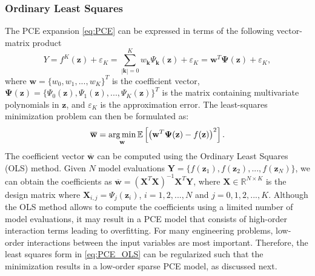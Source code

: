\subsubsection{Ordinary Least Squares}
The PCE expansion \eqref{eq:PCE} can be expressed in terms of the following vector-matrix product
\begin{equation}\label{eq:LSM}
Y = f^{K}(\mathbf{z}) +\varepsilon_K = \sum_{|\mathbf{k}| = 0}^K w_{\mathbf{k}}\Psi_{\mathbf{k}}(\mathbf{z}) + \varepsilon_K = \mathbf{w}^T\boldsymbol{\Psi}(\mathbf{z}) +\varepsilon_K,
\end{equation} 
where $\mathbf{w} = \{w_0,w_1,...,w_K\}^T$ is the coefficient vector, $\boldsymbol{\Psi}(\mathbf{z}) = \{\Psi_0(\mathbf{z}), \Psi_1(\mathbf{z}), ..., \Psi_K(\mathbf{z})\}^T$ is the matrix containing multivariate polynomials in $\mathbf{z}$, and $\varepsilon_K$ is the approximation error. The least-squares minimization problem can then be formulated as:
\begin{equation}\label{eq:PCE_OLS}
\mathbf{\overline{w}} = \operatorname*{arg\,min}_{\mathbf{w}} \mathbb{E}\left[\left(\mathbf{w}^T \boldsymbol{\Psi}(\mathbf{z}) - f(\mathbf{z})\right)^2\right].
 \end{equation}
The coefficient vector $\mathbf{\overline{w}}$ can be computed using the Ordinary Least Squares (OLS) method. Given $N$ model evaluations $\mathbf{Y} = \{f(\mathbf{z}_1), f(\mathbf{z}_2), ..., f(\mathbf{z}_N)\}$, we can obtain the coefficients as $\overline{\mathbf{w}} = (\mathbf{X}^T\mathbf{X})^{-1}\mathbf{X}^T\mathbf{Y}$, where $\mathbf{X}\in \mathbb{R}^{N\times K}$ is the design matrix where $\mathbf{X}_{i,j} = \Psi_{j}(\mathbf{z}_i)$, $i = 1,2, ..., N$ and $j = 0,1,2,..., K$. Although the OLS method allows to compute the coefficients using a limited number of model evaluations, it may result in a PCE model that consists of high-order interaction terms leading to overfitting. For many engineering problems, low-order interactions between the input variables are most important. Therefore, the least squares form in \eqref{eq:PCE_OLS} can be regularized such that the minimization results in a low-order sparse PCE model, as discussed next.

